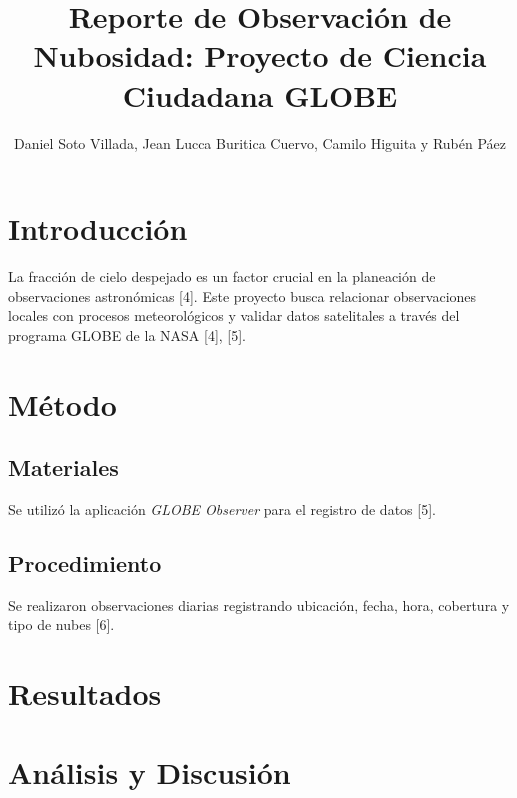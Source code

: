 \documentclass[stu,12pt,floatsintext]{apa7}
\title{Reporte de Observación de Nubosidad: Proyecto de Ciencia Ciudadana GLOBE}
\author{Daniel Soto Villada, Jean Lucca Buritica Cuervo, Camilo Higuita y Rubén Páez}
\affiliation{Universidad de Antioquia}
\begin{document}
\maketitle

\section{Introducción}
La fracción de cielo despejado es un factor crucial en la planeación de observaciones astronómicas [4]. Este proyecto busca relacionar observaciones locales con procesos meteorológicos y validar datos satelitales a través del programa GLOBE de la NASA [4], [5].

\section{Método}
\subsection{Materiales}
Se utilizó la aplicación \textit{GLOBE Observer} para el registro de datos [5].
\subsection{Procedimiento}
Se realizaron observaciones diarias registrando ubicación, fecha, hora, cobertura y tipo de nubes [6].

\section{Resultados}

\section{Análisis y Discusión}

\printbibliography
\end{document}

